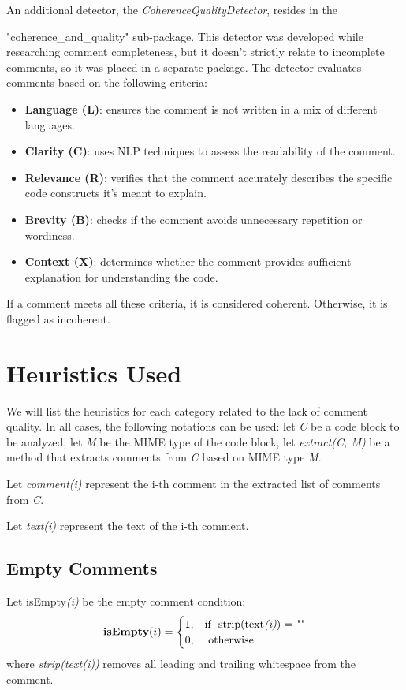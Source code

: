 \noindent An additional detector, the \textit{CoherenceQualityDetector}, resides in the 

\noindent "coherence\_and\_quality" sub-package. This detector was developed while researching comment completeness, but it doesn’t strictly relate to incomplete comments, so it was placed in a separate package. The detector evaluates comments based on the following criteria:
	\begin{itemize}
		\item \textbf{Language (L)}: ensures the comment is not written in a mix of different languages.
		\item \textbf{Clarity (C)}: uses NLP techniques to assess the readability of the comment.
		\item \textbf{Relevance (R)}: verifies that the comment accurately describes the specific code constructs it’s meant to explain.
		\item \textbf{Brevity (B)}: checks if the comment avoids unnecessary repetition or wordiness.
		\item \textbf{Context (X)}: determines whether the comment provides sufficient explanation for understanding the code.
	\end{itemize}
If a comment meets all these criteria, it is considered coherent. Otherwise, it is flagged as incoherent.
	
\section{Heuristics Used}
We will list the heuristics for each category related to the lack of comment quality.
In all cases, the following notations can be used: let \textit{C} be a code block to be analyzed, let \textit{M} be the MIME type of the code block, let \textit{extract(C, M)} be a method that extracts comments from \textit{C} based on MIME type \textit{M}.

\noindent Let \textit{comment(i)} represent the i-th comment in the extracted list of comments from \textit{C}.

\noindent Let \textit{text(i)} represent the text of the i-th comment.

\subsection{Empty Comments}
\noindent Let isEmpty\textit{(i)} be the empty comment condition: 
\begin{equation*}
	\textbf{isEmpty}(i) = \begin{cases}
		1, & \text{if } \text{ strip(text\textit{(i)}) = ""} \\
		0, & \text{ otherwise}
	\end{cases}
\end{equation*}
where \textit{strip(text(i))} removes all leading and trailing whitespace from the comment.

